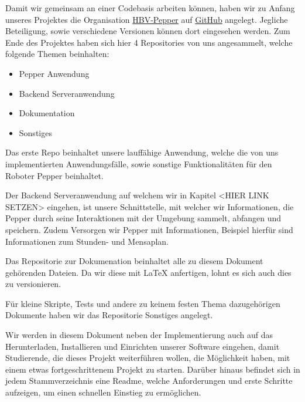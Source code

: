 Damit wir gemeinsam an einer Codebasis arbeiten können, haben wir zu Anfang unseres Projektes
die Organisation \href{https://github.com/ProjectPepperHSB}{HBV-Pepper} auf
\href{https://github.com}{GitHub} angelegt. Jegliche Beteiligung, sowie verschiedene Versionen können dort eingesehen werden.
Zum Ende des Projektes haben sich hier 4 Repositories von uns angesammelt, welche folgende Themen beinhalten:
\begin{itemize}
    \item Pepper Anwendung
    \item Backend Serveranwendung
    \item Dokumentation
    \item Sonstiges
\end{itemize}

Das erste Repo beinhaltet unsere lauffähige Anwendung, welche die von uns
implementierten Anwendungsfälle, sowie sonstige Funktionalitäten für den Roboter Pepper beinhaltet.

Der Backend Serveranwendung auf welchem wir in Kapitel <HIER LINK SETZEN> eingehen, ist unsere Schnittstelle, mit welcher wir
Informationen, die Pepper durch seine Interaktionen mit der Umgebung sammelt, abfangen und speichern. Zudem Versorgen wir
Pepper mit Informationen, Beispiel hierfür sind Informationen zum Stunden- und Mensaplan.

Das Repositorie zur Dokumenation beinhaltet alle zu diesem Dokument gehörenden Dateien. Da wir diese mit LaTeX anfertigen,
lohnt es sich auch dies zu versionieren.

Für kleine Skripte, Tests und andere zu keinem festen Thema dazugehörigen Dokumente haben wir das Repositorie
\grqq{}Sonstiges\grqq{} angelegt.

Wir werden in diesem Dokument neben der Implementierung auch auf das Herunterladen, Installieren und Einrichten
unserer Software eingehen, damit Studierende, die dieses Projekt weiterführen wollen, die Möglichkeit
haben, mit einem etwas fortgeschrittenem Projekt zu starten. Darüber hinaus befindet sich in jedem Stammverzeichnis
eine Readme, welche Anforderungen und erste Schritte aufzeigen, um einen schnellen Einstieg zu ermöglichen.
